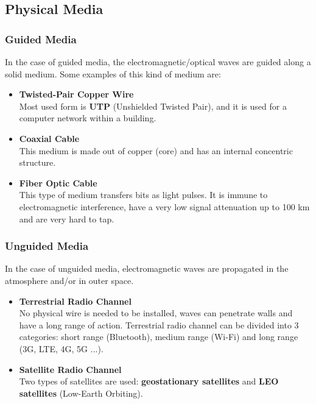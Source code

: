 \documentclass{article}
\begin{document}
\subsection{Physical Media}
\subsubsection{Guided Media}
In the case of guided media, the electromagnetic/optical waves are guided along a solid medium. Some examples of this kind of medium are:

\begin{itemize}
	\item \textbf{Twisted-Pair Copper Wire}
	\vspace{.2cm} \\
	Most used form is \textbf{UTP} (Unshielded Twisted Pair), and it is used for a computer network within a building.
	
	\item \textbf{Coaxial Cable}
	\vspace{.2cm} \\
	This medium is made out of copper (core) and has an internal concentric structure.
	
	\item \textbf{Fiber Optic Cable}
	\vspace{.2cm} \\
	This type of medium transfers bits as light pulses. It is immune to electromagnetic interference, have a very low signal attenuation up to 100 km and are very hard to tap.
\end{itemize}

\subsubsection{Unguided Media}
In the case of unguided media, electromagnetic waves are propagated in the atmosphere and/or in outer space.

\begin{itemize}
	\item \textbf{Terrestrial Radio Channel}
	\vspace{.2cm} \\
	No physical wire is needed to be installed, waves can penetrate walls and have a long range of action. Terrestrial radio channel can be divided into 3 categories: short range (Bluetooth), medium range (Wi-Fi) and long range (3G, LTE, 4G, 5G ...).
	
	\item \textbf{Satellite Radio Channel}
	\vspace{.2cm} \\
	Two types of satellites are used: \textbf{geostationary satellites} and \textbf{LEO satellites} (Low-Earth Orbiting).
\end{itemize}
\end{document}
